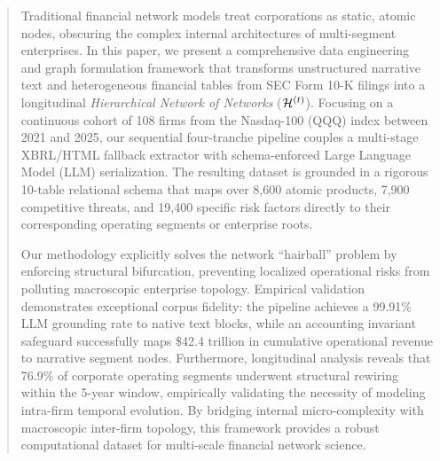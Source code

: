 \begin{abstract}
Traditional financial network models treat corporations as static, atomic nodes, obscuring the complex internal architectures of multi-segment enterprises. In this paper, we present a comprehensive data engineering and graph formulation framework that transforms unstructured narrative text and heterogeneous financial tables from SEC Form 10-K filings into a longitudinal \textit{Hierarchical Network of Networks} ($\Hnet$). Focusing on a continuous cohort of 108 firms from the Nasdaq-100 (QQQ) index between 2021 and 2025, our sequential four-tranche pipeline couples a multi-stage XBRL/HTML fallback extractor with schema-enforced Large Language Model (LLM) serialization. The resulting dataset is grounded in a rigorous 10-table relational schema that maps over 8,600 atomic products, 7,900 competitive threats, and 19,400 specific risk factors directly to their corresponding operating segments or enterprise roots.

Our methodology explicitly solves the network ``hairball'' problem by enforcing structural bifurcation, preventing localized operational risks from polluting macroscopic enterprise topology. Empirical validation demonstrates exceptional corpus fidelity: the pipeline achieves a 99.91\% LLM grounding rate to native text blocks, while an accounting invariant safeguard successfully maps \$42.4 trillion in cumulative operational revenue to narrative segment nodes. Furthermore, longitudinal analysis reveals that 76.9\% of corporate operating segments underwent structural rewiring within the 5-year window, empirically validating the necessity of modeling intra-firm temporal evolution. By bridging internal micro-complexity with macroscopic inter-firm topology, this framework provides a robust computational dataset for multi-scale financial network science.
\end{abstract}